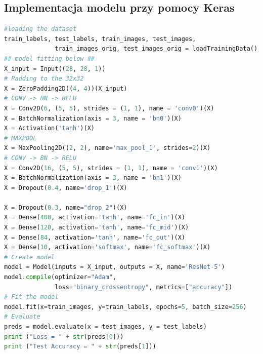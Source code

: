 \subsection{Implementacja modelu przy pomocy Keras}

\label{lst:lenet5keras}
\begin{lstlisting}[language=Python]
#loading the dataset
train_labels, test_labels, train_images, test_images, 
              train_images_orig, test_images_orig = loadTrainingData();
## model fitting below ##
X_input = Input((28, 28, 1))
# Padding to the 32x32
X = ZeroPadding2D((4, 4))(X_input)
# CONV -> BN -> RELU
X = Conv2D(6, (5, 5), strides = (1, 1), name = 'conv0')(X)
X = BatchNormalization(axis = 3, name = 'bn0')(X)
X = Activation('tanh')(X)
# MAXPOOL
X = MaxPooling2D((2, 2), name='max_pool_1', strides=2)(X)
# CONV -> BN -> RELU
X = Conv2D(16, (5, 5), strides = (1, 1), name = 'conv1')(X)
X = BatchNormalization(axis = 3, name = 'bn1')(X)
X = Dropout(0.4, name='drop_1')(X)

X = Dropout(0.3, name="drop_2")(X)
X = Dense(400, activation='tanh', name='fc_in')(X)
X = Dense(120, activation='tanh', name='fc_mid')(X)
X = Dense(84, activation='tanh', name='fc_out')(X)
X = Dense(10, activation='softmax', name='fc_softmax')(X)
# Create model
model = Model(inputs = X_input, outputs = X, name='ResNet-5')
model.compile(optimizer="Adam", 
              loss="binary_crossentropy", metrics=["accuracy"])
# Fit the model
model.fit(x=train_images, y=train_labels, epochs=5, batch_size=256)
# Evaluate
preds = model.evaluate(x = test_images, y = test_labels)
print ("Loss = " + str(preds[0]))
print ("Test Accuracy = " + str(preds[1]))
\end{lstlisting}

